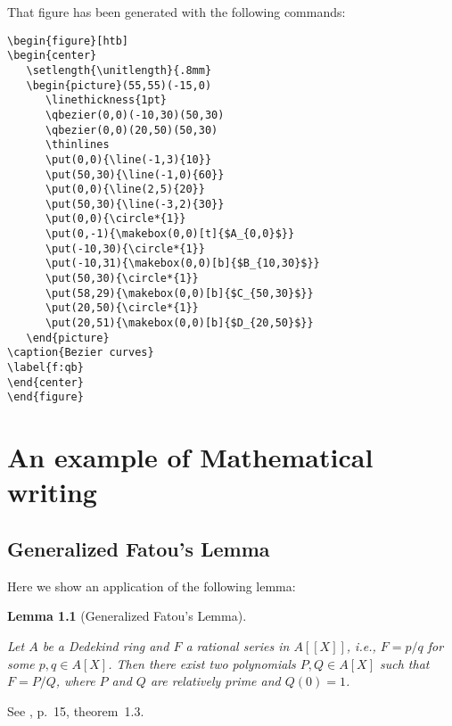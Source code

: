 \documentclass[12pt]{report} %
\newtheorem{lem}[thm]{Lemma}
\theoremstyle{definition}
\theoremstyle{remark}
\begin{document}
That figure has been generated with the following commands:
\begin{verbatim}
\begin{figure}[htb]
\begin{center}
   \setlength{\unitlength}{.8mm}
   \begin{picture}(55,55)(-15,0)
      \linethickness{1pt}
      \qbezier(0,0)(-10,30)(50,30)
      \qbezier(0,0)(20,50)(50,30)
      \thinlines
      \put(0,0){\line(-1,3){10}}
      \put(50,30){\line(-1,0){60}}
      \put(0,0){\line(2,5){20}}
      \put(50,30){\line(-3,2){30}}
      \put(0,0){\circle*{1}}
      \put(0,-1){\makebox(0,0)[t]{$A_{0,0}$}}
      \put(-10,30){\circle*{1}}
      \put(-10,31){\makebox(0,0)[b]{$B_{10,30}$}}
      \put(50,30){\circle*{1}}
      \put(58,29){\makebox(0,0)[b]{$C_{50,30}$}}
      \put(20,50){\circle*{1}}
      \put(20,51){\makebox(0,0)[b]{$D_{20,50}$}}
   \end{picture}
\caption{Bezier curves}
\label{f:qb}
\end{center}
\end{figure}
\end{verbatim}


\chapter{An example of Mathematical writing}
%

\section{Generalized Fatou's Lemma}
%

Here we show an application of the following lemma:

\begin{lem}[Generalized Fatou's Lemma] \label{l:fatou}

Let $A$ be a Dedekind ring and $F$ a rational series 
in $A[[X]]$, i.e., $F = p/q$ for some 
$p, q \in A[X]$. Then there exist two polynomials 
$P, Q \in A[X]$ such that $F = P/Q$, 
where $P$ and $Q$ are relatively prime and 
$Q(0) = 1$.

\end{lem}

\proof
See \cite{bertin:psn}, p.~15, theorem~1.3.
\endproof
\end{document}
